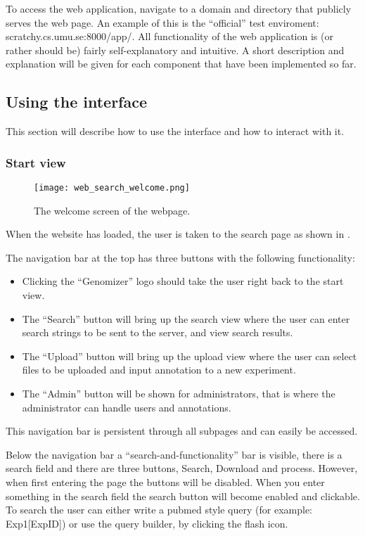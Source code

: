 To access the web application, navigate to a domain and directory that publicly serves the web page. An example of this is the “official” test enviroment: scratchy.cs.umu.se:8000/app/.
All functionality of the web application is (or rather should be) fairly self-explanatory and intuitive. A short description and explanation will be given for each component that have been implemented so far.
\subsection{Using the interface}
This section will describe how to use the interface and how to interact with it.
\subsubsection{Start view}
\begin{figure}[h]
\centering
\texttt{[image: web\_search\_welcome.png]}
\caption{\label{fig:web_search_welcome} The welcome screen of the webpage.}
\end{figure}

When the website has loaded, the user is taken to the search page as shown in .

The navigation bar at the top has three buttons with the following functionality:
\begin{itemize}
	\item Clicking the “Genomizer” logo should take the user right back to the start view.
	\item The “Search” button will bring up the search view where the user can enter search strings to be sent to the server, and view search results.
	\item The “Upload” button will bring up the upload view where the user can select files to be uploaded and input annotation to a new experiment.
	\item The “Admin” button will be shown for administrators, that is where the administrator can handle users and annotations.
\end{itemize}
This navigation bar is persistent through all subpages and can easily be accessed.

Below the navigation bar a “search-and-functionality” bar is visible, there is a search field and there are three buttons, Search, Download and process. However, when first entering the page the buttons will be disabled. When you enter something in the search field the search button will become enabled and clickable. To search the user can either write a pubmed style query (for example: Exp1[ExpID]) or use the query builder, by clicking the flash icon.

